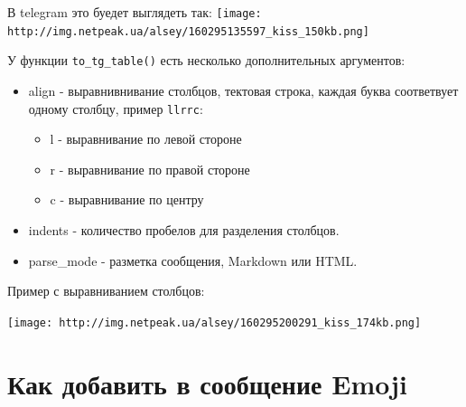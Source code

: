 \documentclass[
]{book}
\newenvironment{Shaded}{\begin{snugshade}}{\end{snugshade}}
\newcommand{\AttributeTok}[1]{\textcolor[rgb]{0.13,0.29,0.53}{#1}}
\newcommand{\CommentTok}[1]{\textcolor[rgb]{0.56,0.35,0.01}{\textit{#1}}}
\newcommand{\DecValTok}[1]{\textcolor[rgb]{0.00,0.00,0.81}{#1}}
\newcommand{\FunctionTok}[1]{\textcolor[rgb]{0.13,0.29,0.53}{\textbf{#1}}}
\newcommand{\NormalTok}[1]{#1}
\newcommand{\OtherTok}[1]{\textcolor[rgb]{0.56,0.35,0.01}{#1}}
\newcommand{\SpecialCharTok}[1]{\textcolor[rgb]{0.81,0.36,0.00}{\textbf{#1}}}
\newcommand{\StringTok}[1]{\textcolor[rgb]{0.31,0.60,0.02}{#1}}
\providecommand{\tightlist}{%
  \setlength{\itemsep}{0pt}\setlength{\parskip}{0pt}}
\begin{document}
В telegram это буедет выглядеть так:
\texttt{[image: http://img.netpeak.ua/alsey/160295135597\_kiss\_150kb.png]}

У функции \texttt{to\_tg\_table()} есть несколько дополнительных аргументов:

\begin{itemize}
\tightlist
\item
  align - выравнивнивание столбцов, тектовая строка, каждая буква соответвует одному столбцу, пример \texttt{\textquotesingle{}llrrc\textquotesingle{}}:

  \begin{itemize}
  \tightlist
  \item
    l - выравнивание по левой стороне
  \item
    r - выравнивание по правой стороне
  \item
    c - выравнивание по центру
  \end{itemize}
\item
  indents - количество пробелов для разделения столбцов.
\item
  parse\_mode - разметка сообщения, Markdown или HTML.
\end{itemize}

Пример с выравниванием столбцов:

\begin{Shaded}
\end{Shaded}

\texttt{[image: http://img.netpeak.ua/alsey/160295200291\_kiss\_174kb.png]}

\section{Как добавить в сообщение Emoji}\label{ux43aux430ux43a-ux434ux43eux431ux430ux432ux438ux442ux44c-ux432-ux441ux43eux43eux431ux449ux435ux43dux438ux435-emoji}
\end{document}

